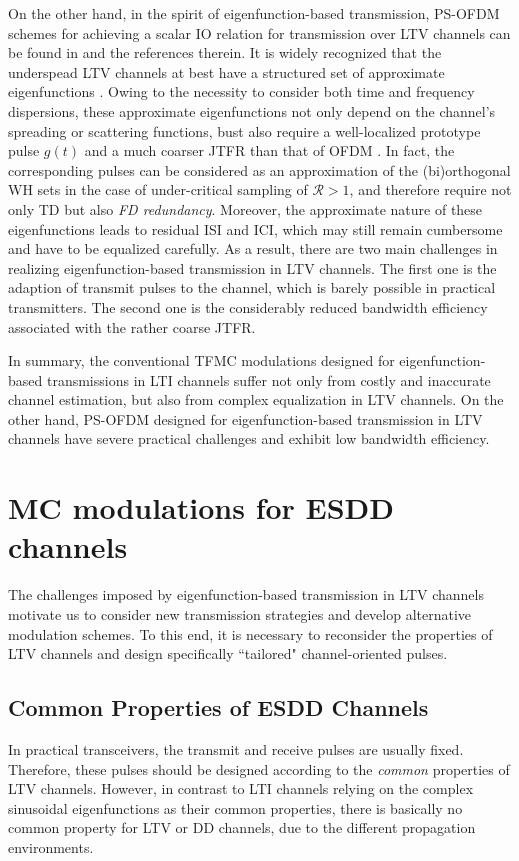 \documentclass[journal]{IEEEtran}
\begin{document}
On the other hand, in the spirit of eigenfunction-based transmission, {PS-OFDM schemes for achieving} a scalar IO relation for transmission over LTV channels
can be found in \cite{haas_wpc_97,strohmer2003,kozek98,matz07,jung07} and the references therein.
It is widely recognized that the underspead LTV channels at best have a structured set of approximate eigenfunctions \cite{eigen}.
Owing to the necessity to consider both time and frequency dispersions, these approximate eigenfunctions not only depend on the channel's spreading or scattering functions, bust also require a well-localized prototype pulse $g(t)$ and a  much coarser JTFR than that of OFDM \cite{eigen,matz07}. In fact, the corresponding pulses can be considered as an approximation of the (bi)orthogonal WH sets in the case of under-critical sampling of $\mathcal R>1$, and therefore require not only TD but also \emph{FD redundancy}.
Moreover, the approximate nature of these eigenfunctions leads to residual ISI and ICI, which may still remain cumbersome and have to be equalized carefully.
As a result, there are two main challenges in realizing eigenfunction-based transmission in LTV channels. The first one is the adaption of transmit pulses to the channel, which is barely possible in practical transmitters. The second one is the considerably reduced bandwidth efficiency associated with the rather coarse JTFR.

In summary, the conventional TFMC modulations designed for eigenfunction-based transmissions in LTI channels suffer not only from costly and inaccurate channel estimation, but also from complex equalization in LTV channels. On the other hand, PS-OFDM designed for eigenfunction-based transmission in LTV channels have severe practical challenges and exhibit low bandwidth efficiency.

\section{MC modulations for ESDD channels}
The challenges imposed by  eigenfunction-based transmission in LTV channels motivate us to consider new transmission strategies and develop alternative modulation schemes. To this end, it is necessary to reconsider the properties of LTV channels and design specifically ``tailored" channel-oriented pulses.

\subsection{Common Properties of ESDD Channels}
In practical transceivers, the transmit and receive pulses are usually fixed. Therefore, these pulses should be designed according to the \emph{common} properties of LTV channels.
However, in contrast to LTI channels relying on the complex sinusoidal eigenfunctions as their common properties, there is basically no common property for LTV or DD channels, due to the different propagation environments.
\end{document}
